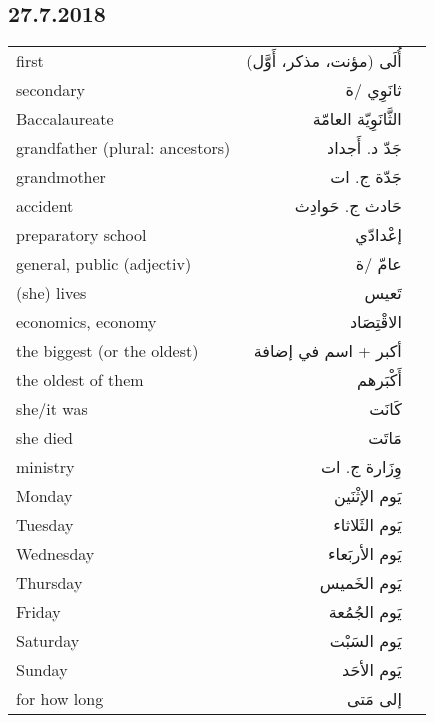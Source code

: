\documentclass[a4paper]{article}
\begin{document}
\subsection{27.7.2018}
\begin{tabular}{lrr}
first & أُلَى (مؤنت، مذكر، أَوَّل) & \\
secondary & ثانَوِي /ة & \\
Baccalaureate  & الثَّانَوِيّة العامّة &  \\
grandfather (plural: ancestors)  & جَدّ   د. أَجداد &  \\
grandmother  & جَدّة   ج. ات &  \\
accident  & حَادث    ج. حَوادِث &  \\
preparatory school  & إعْدادّي &  \\
general, public (adjectiv)  & عامّ  /ة &  \\
(she) lives  & تَعيس &  \\
economics, economy  & الاقْتِصَاد &  \\
the biggest (or the oldest)  & أكبر + اسم في إضافة &  \\
the oldest of them  & أَكْبَرهم &  \\
she/it was  & كَانَت &  \\
she died  & مَاتَت &  \\
ministry  & وِزَارة ج. ات &  \\
    Monday &  يَوم الإثْنَين & \\
    Tuesday & يَوم الثَلاثاء & \\
    Wednesday & يَوم الأربَعاء & \\
    Thursday & يَوم الخَميس & \\
    Friday & يَوم الجُمُعة & \\
    Saturday & يَوم السَبْت & \\
    Sunday & يَوم الأحَد & \\
    for how long & إلى مَتى & \\
\end{tabular}

\end{document}
